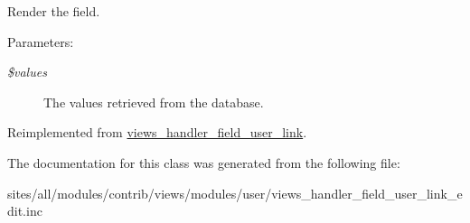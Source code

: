 Render the field.

\begin{Desc}
\item[Parameters:]
\begin{description}
\item[{\em \$values}]The values retrieved from the database. \end{description}
\end{Desc}


Reimplemented from \hyperlink{classviews__handler__field__user__link_f81b37cfa8e0c2363ad8ed9bb601cd14}{views\_\-handler\_\-field\_\-user\_\-link}.

The documentation for this class was generated from the following file:\begin{CompactItemize}
\item 
sites/all/modules/contrib/views/modules/user/views\_\-handler\_\-field\_\-user\_\-link\_\-edit.inc\end{CompactItemize}
